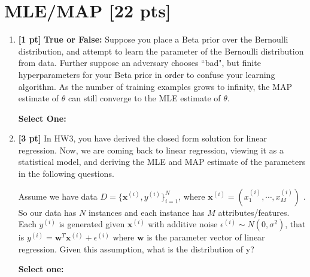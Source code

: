 \documentclass{article}
\newcommand{\blackcircle}{\tikz\draw[black,fill=black] (0,0) circle (1ex);}
\renewcommand{\circle}{\tikz\draw[black] (0,0) circle (1ex);}
\begin{document}
\section{MLE/MAP [22 pts]}
\begin{enumerate}


    \item \textbf{[1 pt]} \textbf{True or False:} Suppose you place a Beta prior over the Bernoulli distribution, and attempt to learn the parameter of the Bernoulli distribution from data. Further suppose an adversary chooses ``bad", but finite hyperparameters for your Beta prior in order to confuse your learning algorithm. As the number of training examples grows to infinity, the MAP estimate of $\theta$ can still converge to the MLE estimate of $\theta$.
    
    \textbf{Select One:}
    
    
    \item \textbf{[3 pt]} In HW3, you have derived the closed form solution for linear regression. Now, we are coming back to linear regression, viewing it as a statistical model, and deriving the MLE and MAP estimate of the parameters in the following questions. 
    
    Assume we have data $D = \{\mathbf{x}^{(i)}, y^{(i)}\}_{i=1}^{N}$, where $\mathbf{x}^{(i)} = (x_1^{(i)}, \cdots, x_M^{(i)})$ . So our data has $N$  instances and each instance has $M$  attributes/features. Each $y^{(i)}$ is generated given $\mathbf{x}^{(i)}$ with additive noise $\epsilon^{(i)} \sim N(0, \sigma^2)$, that is $y^{(i)} = \mathbf{w}^T \mathbf{x}^{(i)} + \epsilon^{(i)}$ where $\mathbf{w}$  is the parameter vector of linear regression. Given this assumption, what is the distribution of y? 

    \textbf{Select one:}
    

\end{enumerate}
\end{document}
